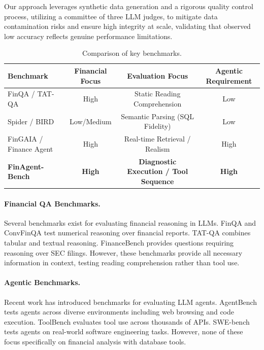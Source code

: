 \documentclass[11pt]{article}
\begin{document}
Our approach leverages synthetic data generation and a rigorous quality control process, utilizing a committee of three LLM judges, to
mitigate data contamination risks and ensure high integrity at scale, validating that observed low accuracy reflects genuine
performance limitations.

\begin{table}[t]
    \centering
    \small
    \setlength{\tabcolsep}{8pt}
    \begin{tabular}{lccc}
        \toprule
        \textbf{Benchmark} & \textbf{Financial Focus} & \textbf{Evaluation Focus} & \textbf{Agentic Requirement} \\
        \midrule
        FinQA / TAT-QA          & High        & Static Reading Comprehension       & Low  \\
        Spider / BIRD           & Low/Medium  & Semantic Parsing (SQL Fidelity)    & Low  \\
        FinGAIA / Finance Agent & High        & Real-time Retrieval / Realism      & High \\
        \addlinespace
        \textbf{FinAgent-Bench} & \textbf{High} & \textbf{Diagnostic Execution / Tool Sequence} & \textbf{High} \\
        \bottomrule
    \end{tabular}
    \caption{Comparison of key benchmarks.}
    \label{tab:benchmark_comparison}
\end{table}

\paragraph{Financial QA Benchmarks.}
Several benchmarks exist for evaluating financial reasoning in LLMs. FinQA \citep{chen2021finqa} and ConvFinQA \citep{chen2022convfinqa} test numerical reasoning over financial reports. TAT-QA \citep{zhu-etal-2021-tat} combines tabular and textual reasoning. FinanceBench \citep{islam2023financebench} provides questions requiring reasoning over SEC filings. However, these benchmarks provide all necessary information in context, testing reading comprehension rather than tool use.

\paragraph{Agentic Benchmarks.}
Recent work has introduced benchmarks for evaluating LLM agents. AgentBench \citep{liu2023agentbench} tests agents across diverse environments including web browsing and code execution. ToolBench \citep{qin2023toolllm} evaluates tool use across thousands of APIs. SWE-bench \citep{jimenez2024swebench} tests agents on real-world software engineering tasks. However, none of these focus specifically on financial analysis with database tools.
\end{document}
